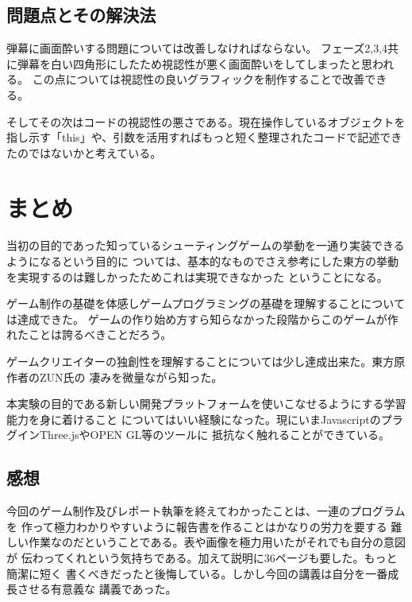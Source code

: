 \documentclass[a4paper,titlepage,11pt]{ltjsarticle}
\begin{document}
\subsection{問題点とその解決法}
弾幕に画面酔いする問題については改善しなければならない。
フェーズ2,3,4共に弾幕を白い四角形にしたため視認性が悪く画面酔いをしてしまったと思われる。
この点については視認性の良いグラフィックを制作することで改善できる。

そしてその次はコードの視認性の悪さである。現在操作しているオブジェクトを
指し示す「this」や、引数を活用すればもっと短く整理されたコードで記述できたのではないかと考えている。
\section{まとめ}
当初の目的であった知っているシューティングゲームの挙動を一通り実装できるようになるという目的に
ついては、基本的なものでさえ参考にした東方の挙動を実現するのは難しかったためこれは実現できなかった
ということになる。

ゲーム制作の基礎を体感しゲームプログラミングの基礎を理解することについては達成できた。
ゲームの作り始め方すら知らなかった段階からこのゲームが作れたことは誇るべきことだろう。

ゲームクリエイターの独創性を理解することについては少し達成出来た。東方原作者のZUN氏の
凄みを微量ながら知った。

本実験の目的である新しい開発プラットフォームを使いこなせるようにする学習能力を身に着けること
についてはいい経験になった。現にいまJavascriptのプラグインThree.jsやOPEN GL等のツールに
抵抗なく触れることができている。
\subsection{感想}
今回のゲーム制作及びレポート執筆を終えてわかったことは、一連のプログラムを
作って極力わかりやすいように報告書を作ることはかなりの労力を要する
難しい作業なのだということである。表や画像を極力用いたがそれでも自分の意図が
伝わってくれという気持ちである。加えて説明に36ページも要した。もっと簡潔に短く
書くべきだったと後悔している。しかし今回の講義は自分を一番成長させる有意義な
講義であった。
\end{document}

